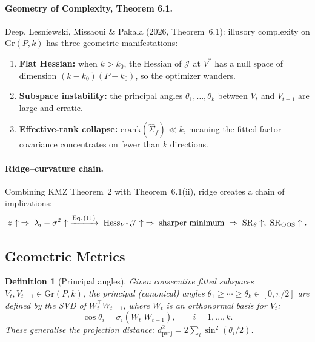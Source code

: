 \documentclass[11pt,a4paper]{article}
\newtheorem{definition}{Definition}
\begin{document}
\paragraph{Geometry of Complexity, Theorem 6.1.}
Deep, Lesniewski, Missaoui \& Pakala (2026, Theorem~6.1): illusory complexity on $\mathrm{Gr}(P, k)$ has three geometric manifestations:
\begin{enumerate}[nosep, label=(\alph*)]
  \item \textbf{Flat Hessian:} when $k > k_0$, the Hessian of $\mathcal{J}$ at $V^*$ has a null space of dimension $(k - k_0)(P - k_0)$, so the optimizer wanders.
  \item \textbf{Subspace instability:} the principal angles $\theta_1, \ldots, \theta_k$ between $V_t$ and $V_{t-1}$ are large and erratic.
  \item \textbf{Effective-rank collapse:} $\mathrm{erank}(\hat\Sigma_f) \ll k$, meaning the fitted factor covariance concentrates on fewer than $k$ directions.
\end{enumerate}

\paragraph{Ridge--curvature chain.}
Combining KMZ Theorem~2 with Theorem~6.1(ii), ridge creates a chain of implications:
\begin{equation}
  z \uparrow \;\Rightarrow\; \lambda_i - \sigma^2 \uparrow
  \;\xrightarrow{\text{Eq.\,(11)}}\;
  \mathrm{Hess}_{V^*}\mathcal{J} \uparrow
  \;\Rightarrow\; \text{sharper minimum}
  \;\Rightarrow\; \mathrm{SR}_\theta \uparrow,\; \mathrm{SR}_{\mathrm{OOS}} \uparrow.
  \label{eq:chain}
\end{equation}

\subsection{Geometric Metrics}

\begin{definition}[Principal angles]
Given consecutive fitted subspaces $V_t, V_{t-1} \in \mathrm{Gr}(P, k)$, the \emph{principal (canonical) angles} $\theta_1 \geq \cdots \geq \theta_k \in [0, \pi/2]$ are defined by the SVD of $W_t^\top W_{t-1}$, where $W_t$ is an orthonormal basis for $V_t$:
\[
  \cos \theta_i = \sigma_i(W_t^\top W_{t-1}), \qquad i = 1, \ldots, k.
\]
These generalise the projection distance: $d_{\mathrm{proj}}^2 = 2\sum_i \sin^2(\theta_i / 2)$.
\end{definition}
\end{document}
